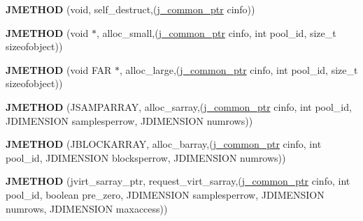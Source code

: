 \begin{DoxyCompactItemize}
\item 
\mbox{\label{structjpeg__memory__mgr_ae80ddea0ba4f845f91d3a30e350b5f44}} 
{\bfseries J\+M\+E\+T\+H\+OD} (void, self\+\_\+destruct,(\hyperlink{structjpeg__common__struct}{j\+\_\+common\+\_\+ptr} cinfo))
\item 
\mbox{\label{structjpeg__memory__mgr_a9372ad24444dda23175cc9203105911c}} 
{\bfseries J\+M\+E\+T\+H\+OD} (void $\ast$, alloc\+\_\+small,(\hyperlink{structjpeg__common__struct}{j\+\_\+common\+\_\+ptr} cinfo, int pool\+\_\+id, size\+\_\+t sizeofobject))
\item 
\mbox{\label{structjpeg__memory__mgr_a130f6dbc700cc045bdbe35beff2cb326}} 
{\bfseries J\+M\+E\+T\+H\+OD} (void F\+AR $\ast$, alloc\+\_\+large,(\hyperlink{structjpeg__common__struct}{j\+\_\+common\+\_\+ptr} cinfo, int pool\+\_\+id, size\+\_\+t sizeofobject))
\item 
\mbox{\label{structjpeg__memory__mgr_a3fdd2e1dfdc089fd61f17b608c0263f2}} 
{\bfseries J\+M\+E\+T\+H\+OD} (J\+S\+A\+M\+P\+A\+R\+R\+AY, alloc\+\_\+sarray,(\hyperlink{structjpeg__common__struct}{j\+\_\+common\+\_\+ptr} cinfo, int pool\+\_\+id, J\+D\+I\+M\+E\+N\+S\+I\+ON samplesperrow, J\+D\+I\+M\+E\+N\+S\+I\+ON numrows))
\item 
\mbox{\label{structjpeg__memory__mgr_aefc8abe884dab5648c1e4e7ada2e2e18}} 
{\bfseries J\+M\+E\+T\+H\+OD} (J\+B\+L\+O\+C\+K\+A\+R\+R\+AY, alloc\+\_\+barray,(\hyperlink{structjpeg__common__struct}{j\+\_\+common\+\_\+ptr} cinfo, int pool\+\_\+id, J\+D\+I\+M\+E\+N\+S\+I\+ON blocksperrow, J\+D\+I\+M\+E\+N\+S\+I\+ON numrows))
\item 
\mbox{\label{structjpeg__memory__mgr_a34b830d9d7b2f4fd043e98421a700503}} 
{\bfseries J\+M\+E\+T\+H\+OD} (jvirt\+\_\+sarray\+\_\+ptr, request\+\_\+virt\+\_\+sarray,(\hyperlink{structjpeg__common__struct}{j\+\_\+common\+\_\+ptr} cinfo, int pool\+\_\+id, boolean pre\+\_\+zero, J\+D\+I\+M\+E\+N\+S\+I\+ON samplesperrow, J\+D\+I\+M\+E\+N\+S\+I\+ON numrows, J\+D\+I\+M\+E\+N\+S\+I\+ON maxaccess))
\item 
\mbox{\label{structjpeg__memory__mgr_aee93326ad6a64714443e90044614d2a6}} 

\end{DoxyCompactItemize}
